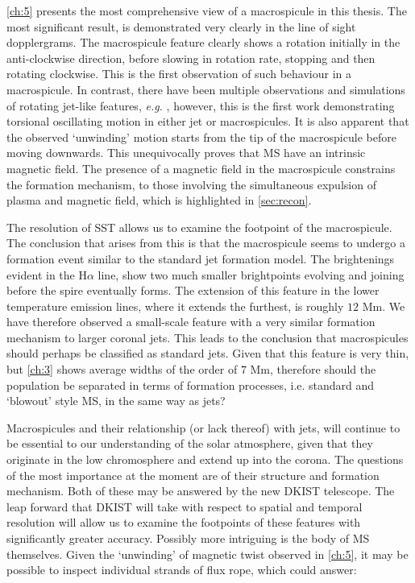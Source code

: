 \cref{ch:5} presents the most comprehensive view of a macrospicule in this thesis.
The most significant result, is demonstrated very clearly in the line of sight dopplergrams.
The macrospicule feature clearly shows a rotation initially in the anti-clockwise direction, before slowing in rotation rate, stopping and then rotating clockwise.
This is the first observation of such behaviour in a macrospicule.
In contrast, there have been multiple observations and simulations of rotating jet-like features, \emph{e.g.} \cite{Kamio2010, Curdt2011, Majarska2011}, however, this is the first work demonstrating torsional oscillating motion in either jet or macrospicules.
It is also apparent that the observed `unwinding' motion starts from the tip of the macrospicule before moving downwards.  
This unequivocally proves that MS have an intrinsic magnetic field.
The presence of a magnetic field in the macrospicule constrains the formation mechanism, to those involving the simultaneous expulsion of plasma and magnetic field, which is highlighted in \cref{sec:recon}.

The resolution of SST allows us to examine the footpoint of the macrospicule.
The conclusion that arises from this is that the macrospicule seems to undergo a formation event similar to the \cite{Shibata1992} standard jet formation model.
The brightenings evident in the H$\alpha$ line, show two much smaller brightpoints evolving and joining before the spire eventually forms.
The extension of this feature in the lower temperature emission lines, where it extends the furthest, is roughly $12$ Mm.
We have therefore observed a small-scale feature with a very similar formation mechanism to larger coronal jets.
This leads to the conclusion that macrospicules should perhaps be classified as standard jets.
Given that this feature is very thin, but \cref{ch:3} shows average widths of the order of $7$ Mm, therefore should the population be separated in terms of formation processes, i.e. standard and `blowout' style MS, in the same way as jets?

Macrospicules and their relationship (or lack thereof) with jets, will continue to be essential to our understanding of the solar atmosphere, given that they originate in the low chromosphere and extend up into the corona.
The questions of the most importance at the moment are of their structure and formation mechanism.
Both of these may be answered by the new DKIST telescope.
The leap forward that DKIST will take with respect to spatial and temporal resolution will allow us to examine the footpoints of these features with significantly greater accuracy.
Possibly more intriguing is the body of MS themselves.
Given the `unwinding' of magnetic twist observed in \cref{ch:5}, it may be possible to inspect individual strands of flux rope, which could answer:

